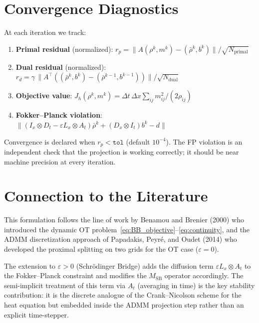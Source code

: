 \documentclass[11pt]{article}
\begin{document}
\section{Convergence Diagnostics}

At each iteration we track:
\begin{enumerate}
  \item \textbf{Primal residual} (normalized):
    $r_p = \|A(\rho^k,m^k) - (\bar\rho^k,b^k)\| / \sqrt{N_{\mathrm{primal}}}$
  \item \textbf{Dual residual} (normalized):
    $r_d = \gamma\,\|A^\top((\bar\rho^k,b^k) - (\bar\rho^{k-1},b^{k-1}))\| / \sqrt{N_{\mathrm{dual}}}$
  \item \textbf{Objective value}:
    $J_h(\rho^k, m^k) = \Delta t\,\Delta x\sum_{ij} m_{ij}^2/(2\rho_{ij})$
  \item \textbf{Fokker--Planck violation}:
    $\|(I_x \otimes D_t - \varepsilon L_x \otimes A_t)\bar\rho^k
       + (D_x \otimes I_t)b^k - d\|$
\end{enumerate}
Convergence is declared when $r_p < \texttt{tol}$ (default $10^{-4}$).
The FP violation is an independent check that the projection is working
correctly; it should be near machine precision at every iteration.

\section{Connection to the Literature}

This formulation follows the line of work by Benamou and Brenier (2000)
who introduced the dynamic OT problem~\eqref{eq:BB_objective}--\eqref{eq:continuity},
and the ADMM discretization approach of Papadakis, Peyr\'{e}, and Oudet (2014)
who developed the proximal splitting on two grids for the OT case ($\varepsilon=0$).

The extension to $\varepsilon > 0$ (Schr\"{o}dinger Bridge) adds the
diffusion term $\varepsilon L_x \otimes A_t$ to the Fokker--Planck constraint
and modifies the $M_{\mathrm{SB}}$ operator accordingly.  The semi-implicit
treatment of this term via $A_t$ (averaging in time) is the key stability
contribution: it is the discrete analogue of the Crank--Nicolson scheme for
the heat equation but embedded inside the ADMM projection step rather than
an explicit time-stepper.
\end{document}
